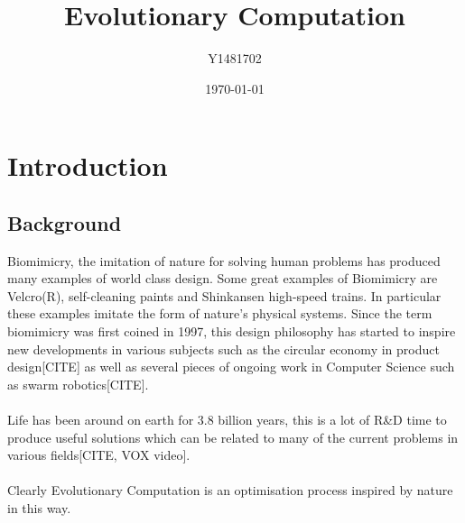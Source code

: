 \documentclass{article}
\title{Evolutionary Computation}
\author{Y1481702}
\date{\today}
\begin{document}

\begin{titlepage}
\maketitle
\tableofcontents
\end{titlepage}




\section{Introduction} 


\subsection{Background}
Biomimicry, the imitation of nature for solving human problems has produced many examples of world class design. 
Some great examples of Biomimicry are Velcro(R), self-cleaning paints and Shinkansen high-speed trains\cite{biomimicry}. In particular these examples imitate the form of nature's physical systems. Since the term biomimicry was first coined in 1997, this design philosophy has started to inspire new developments in various subjects such as the circular economy in product design[CITE] as well as several pieces of ongoing work in Computer Science such as swarm robotics[CITE].
\\\\
Life has been around on earth for 3.8 billion years, this is a lot of R\&D time to produce useful solutions which can be related to many of the current problems in various fields[CITE, VOX video].
\\\\
Clearly Evolutionary Computation is an optimisation process inspired by nature in this way.
\end{document}
